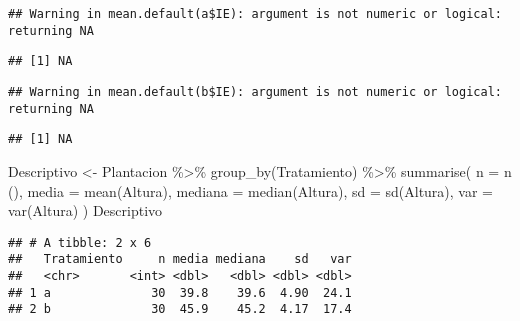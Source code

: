 \documentclass[
]{article}
\newenvironment{Shaded}{\begin{snugshade}}{\end{snugshade}}
\newcommand{\AttributeTok}[1]{\textcolor[rgb]{0.77,0.63,0.00}{#1}}
\newcommand{\CommentTok}[1]{\textcolor[rgb]{0.56,0.35,0.01}{\textit{#1}}}
\newcommand{\FunctionTok}[1]{\textcolor[rgb]{0.00,0.00,0.00}{#1}}
\newcommand{\NormalTok}[1]{#1}
\newcommand{\OtherTok}[1]{\textcolor[rgb]{0.56,0.35,0.01}{#1}}
\newcommand{\SpecialCharTok}[1]{\textcolor[rgb]{0.00,0.00,0.00}{#1}}
\newcommand{\StringTok}[1]{\textcolor[rgb]{0.31,0.60,0.02}{#1}}
\begin{document}
\begin{verbatim}
## Warning in mean.default(a$IE): argument is not numeric or logical: returning NA
\end{verbatim}

\begin{verbatim}
## [1] NA
\end{verbatim}

\begin{Shaded}
\end{Shaded}

\begin{verbatim}
## Warning in mean.default(b$IE): argument is not numeric or logical: returning NA
\end{verbatim}

\begin{verbatim}
## [1] NA
\end{verbatim}

\begin{Shaded}
\begin{Highlighting}[]
\NormalTok{Descriptivo }\OtherTok{\textless{}{-}}\NormalTok{ Plantacion }\SpecialCharTok{\%\textgreater{}\%} 
  \FunctionTok{group\_by}\NormalTok{(Tratamiento) }\SpecialCharTok{\%\textgreater{}\%} 
  \FunctionTok{summarise}\NormalTok{(}
            \AttributeTok{n =} \FunctionTok{n}\NormalTok{ (),}
            \AttributeTok{media =} \FunctionTok{mean}\NormalTok{(Altura),}
            \AttributeTok{mediana =} \FunctionTok{median}\NormalTok{(Altura), }
            \AttributeTok{sd =} \FunctionTok{sd}\NormalTok{(Altura), }
            \AttributeTok{var =} \FunctionTok{var}\NormalTok{(Altura)}
\NormalTok{  )}
\NormalTok{Descriptivo }
\end{Highlighting}
\end{Shaded}

\begin{verbatim}
## # A tibble: 2 x 6
##   Tratamiento     n media mediana    sd   var
##   <chr>       <int> <dbl>   <dbl> <dbl> <dbl>
## 1 a              30  39.8    39.6  4.90  24.1
## 2 b              30  45.9    45.2  4.17  17.4
\end{verbatim}

\begin{Shaded}
\end{Shaded}
\end{document}
